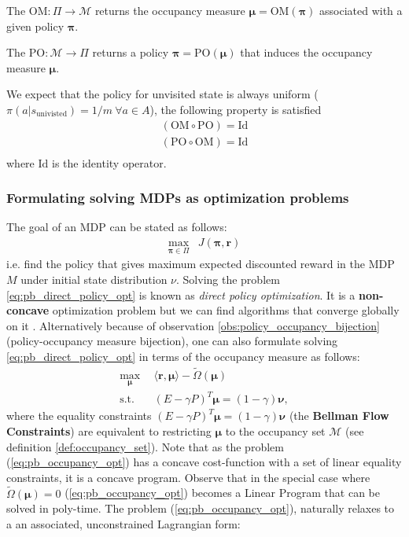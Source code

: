 \begin{definition}
    The $\text{OM}:\Pi \rightarrow \mathcal{M}$ returns the occupancy measure $\bm{\mu}=\text{OM}(\bm{\pi})$ associated with a given policy $\bm{\pi}$.
\end{definition}
\begin{definition}
    The $\text{PO}: \mathcal{M} \rightarrow \Pi$ returns a policy $\bm{\pi}=\text{PO}(\bm{\mu})$ that induces the occupancy measure $\bm{\mu}$.
\end{definition}

We expect that the policy for unvisited state is always uniform ($\pi(a|s_\text{univisted})=1/m~\forall a \in A$), the following property is satisfied
\begin{align*}
    (\text{OM} \circ \text{PO}) = \text{Id}\\
    (\text{PO} \circ \text{OM}) = \text{Id}\\
\end{align*}
where $\text{Id}$ is the identity operator.

\subsubsection{Formulating solving MDPs as optimization problems} \label{sec:opt_sol_mdp}

The goal of an MDP can be stated as follows:
\begin{align}
    \max_{\bm{\pi} \in \Pi} &J(\bm{\pi},\bm{r})
    \label{eq:pb_direct_policy_opt}
\end{align}
i.e. find the policy that gives maximum expected discounted reward in the MDP $\textit{M}$ under initial state distribution $\nu$. Solving the problem \ref{eq:pb_direct_policy_opt} is known as \textit{direct policy optimization}. It is a \textbf{non-concave} optimization problem but we can find algorithms that converge globally on it \cite{Agarwal2020}. Alternatively because of observation \ref{obs:policy_occupancy_bijection} (policy-occupancy measure bijection), one can also formulate solving \ref{eq:pb_direct_policy_opt} in terms of the occupancy measure as follows:
\begin{equation}
    \begin{aligned}
        \max_{\bm{\mu}} & ~~ \langle \bm{r}, \bm{\bm{\mu}} \rangle - \tilde{\Omega}(\bm{\mu})\\
        \text{s.t.} & ~~  (E-\gamma P)^T  \bm{\mu} = (1-\gamma) \bm{\nu},
    \end{aligned}
    \label{eq:pb_occupancy_opt}
\end{equation}
where the equality constraints $ (E-\gamma P)^T  \bm{\mu} = (1-\gamma) \bm{\nu}$ (the \textbf{Bellman Flow Constraints}) are equivalent to restricting $\bm{\mu}$ to the occupancy set $\mathcal{M}$ (see definition \ref{def:occupancy_set}). Note that as the problem (\ref{eq:pb_occupancy_opt}) has a concave cost-function with a set of linear equality constraints, it is a concave program. Observe that in the special case where $\tilde{\Omega}(\bm{\mu})=0$ (\ref{eq:pb_occupancy_opt}) becomes a Linear Program that can be solved in poly-time. The problem (\ref{eq:pb_occupancy_opt}), naturally relaxes to a an associated, unconstrained Lagrangian form:

